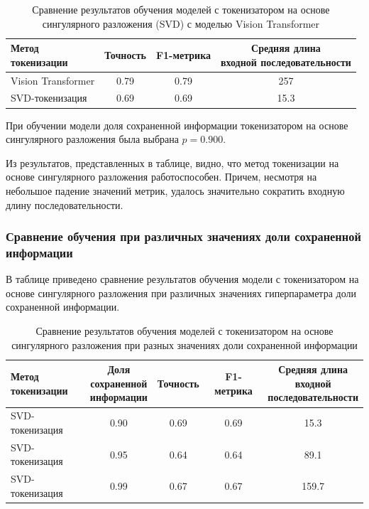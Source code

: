 \documentclass[times,specification,annotation]{itmo-student-thesis}
\begin{document}
\begin{table}[H]
  \centering
  \caption{Сравнение результатов обучения моделей с токенизатором на основе сингулярного разложения (SVD) с моделью Vision Transformer}
  \label{tab:svd-tokenization}
  \begin{tabular}{|l|c|c|c|}
    \hline
    \makecell{Метод \\ токенизации} 
      & {Точность} 
      & {F1-метрика} 
      & \makecell{Средняя длина \\ входной последовательности} \\ 
    \hline
    Vision Transformer & 0.79 & 0.79 & 257 \\
    SVD-токенизация & 0.69 & 0.69 & 15.3 \\ \hline
  \end{tabular}
\end{table}

При обучении модели доля сохраненной информации токенизатором на основе сингулярного разложения была выбрана $p = 0.900$.

Из результатов, представленных в таблице, видно, что метод токенизации на основе сингулярного разложения работоспособен. Причем, несмотря на небольшое падение значений метрик, удалось значительно сократить входную длину последовательности.

\subsubsection{Сравнение обучения при различных значениях доли сохраненной информации}

В таблице приведено сравнение результатов обучения модели с токенизатором на основе сингулярного разложения при различных значениях гиперпараметра доли сохраненной информации.

\begin{table}[H]
  \centering
  \caption{Сравнение результатов обучения моделей с токенизатором на основе сингулярного разложения при разных значениях доли сохраненной информации}
  \label{tab:svd-tokenization-disp}
  \begin{tabular}{|l|c|c|c|c|}
    \hline
    \makecell{Метод \\ токенизации}
      & \makecell{Доля \\ сохраненной \\ информации}
      & {Точность} 
      & {F1-метрика} 
      & \makecell{Средняя длина \\ входной \\ последовательности} \\ 
    \hline
    SVD-токенизация & 0.90 & 0.69 & 0.69 & 15.3 \\
    SVD-токенизация & 0.95 & 0.64 & 0.64 & 89.1 \\
    SVD-токенизация & 0.99 & 0.67 & 0.67 & 159.7 \\ \hline
  \end{tabular}
\end{table}
\end{document}
